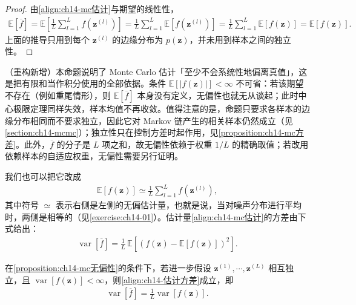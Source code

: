 \documentclass[../../main.tex]{subfiles}
\begin{document}
\begin{proof}
由\eqref{align:ch14-mc估计}与期望的线性性，
\begin{align*}
\mathbb{E}\left[\overline{f}\right]=\mathbb{E}\left[\frac{1}{L}\sum_{l=1}^{L}f\!\left(\bm{z}^{(l)}\right)\right]=\frac{1}{L}\sum_{l=1}^{L}\mathbb{E}\left[f\!\left(\bm{z}^{(l)}\right)\right]=\frac{1}{L}\sum_{l=1}^{L}\mathbb{E}[f(\bm{z})]=\mathbb{E}[f(\bm{z})].
\end{align*}
上面的推导只用到每个 $\bm{z}^{(l)}$ 的边缘分布为 $p(\bm{z})$，并未用到样本之间的独立性。
\end{proof}

\begin{remark}（重构新增）本命题说明了 Monte Carlo 估计「至少不会系统性地偏离真值」，这是把有限和当作积分使用的全部依据。条件 $\mathbb{E}[|f(\bm{z})|]<\infty$ 不可省：若该期望不存在（例如重尾情形），则 $\mathbb{E}[\overline{f}]$ 本身没有定义，无偏性也就无从谈起；此时中心极限定理同样失效，样本均值不再收敛。值得注意的是，命题只要求各样本的边缘分布相同而不要求独立，因此它对 Markov 链产生的相关样本仍然成立（见\cref{section:ch14-mcmc}）；独立性只在控制方差时起作用，见\cref{proposition:ch14-mc方差}。此外，$\overline{f}$ 的分子是 $L$ 项之和，故无偏性依赖于权重 $1/L$ 的精确取值；若改用依赖样本的自适应权重，无偏性需要另行证明。
\end{remark}

我们也可以把它改成
\begin{align}
\mathbb{E}[f(\bm{z})]\simeq\frac{1}{L}\sum_{l=1}^{L}f\!\left(\bm{z}^{(l)}\right),
\label{align:ch14-无偏近似}
\end{align}
其中符号 $\simeq$ 表示右侧是左侧的无偏估计量，也就是说，当对噪声分布进行平均时，两侧是相等的（见\cref{exercise:ch14-01}）。估计量\eqref{align:ch14-mc估计}的方差由下式给出：
\begin{align}
\operatorname{var}\left[\overline{f}\right]=\frac{1}{L}\,\mathbb{E}\left[\left(f(\bm{z})-\mathbb{E}[f(\bm{z})]\right)^{2}\right].
\label{align:ch14-估计方差}
\end{align}

\begin{proposition}\label{proposition:ch14-mc方差}
在\cref{proposition:ch14-mc无偏性}的条件下，若进一步假设 $\bm{z}^{(1)},\cdots,\bm{z}^{(L)}$ 相互独立，且 $\operatorname{var}[f(\bm{z})]<\infty$，则\eqref{align:ch14-估计方差}成立，即
\begin{align}
\operatorname{var}\left[\overline{f}\right]=\frac{1}{L}\operatorname{var}[f(\bm{z})].
\label{align:ch14-方差iid}
\end{align}
\end{proposition}
\end{document}
